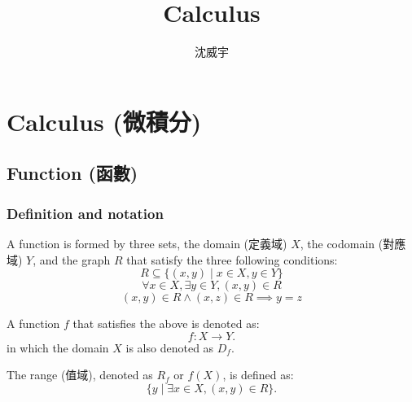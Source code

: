\documentclass[a4paper,12pt]{report}
\begin{document}
\title{Calculus}
\author{沈威宇}
\date{\temtoday}
\titletocdoc
\chapter{Calculus (微積分)}


\section{Function (函數)}
\subsection{Definition and notation}
A function is formed by three sets, the domain (定義域) $X$, the codomain (對應域) $Y$, and the graph $R$ that satisfy the three following conditions:
\[R\subseteq \{(x,y)\mid x\in X,y\in Y\}\]
\[\forall x\in X,\exists y\in Y,\left(x,y\right)\in R \]
\[ (x,y)\in R\land (x,z)\in R\implies y=z\]

A function $f$ that satisfies the above is denoted as:
\[f\colon X\to Y.\]
in which the domain $X$ is also denoted as $D_f$.

The range (值域), denoted as $R_f$ or $f(X)$, is defined as:
\[\{ y \mid \exists x \in X, (x, y) \in R \}.\]
\end{document}
